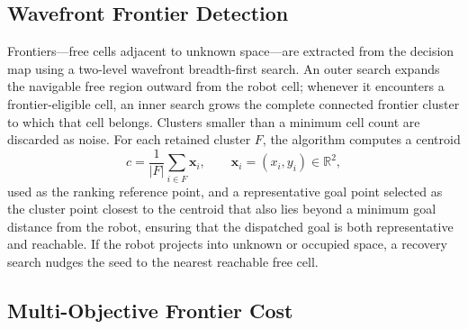 \subsection{Wavefront Frontier Detection}
\label{subsec:wavefront}

Frontiers---free cells adjacent to unknown space---are extracted from the
decision map using a two-level wavefront breadth-first search. An outer search
expands the navigable free region outward from the robot cell; whenever it
encounters a frontier-eligible cell, an inner search grows the complete
connected frontier cluster to which that cell belongs. Clusters smaller than a
minimum cell count are discarded as noise. For each retained cluster $F$, the
algorithm computes a centroid
\begin{equation}
  c = \frac{1}{\lvert F\rvert}\sum_{i\in F}\mathbf{x}_i,
  \qquad \mathbf{x}_i=(x_i,y_i)\in\mathbb{R}^2,
  \label{eq:centroid}
\end{equation}
used as the ranking reference point, and a representative goal point selected
as the cluster point closest to the centroid that also lies beyond a minimum
goal distance from the robot, ensuring that the dispatched goal is both
representative and reachable. If the robot projects into unknown or occupied
space, a recovery search nudges the seed to the nearest reachable free cell.

\subsection{Multi-Objective Frontier Cost}
\label{subsec:cost}

